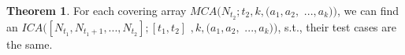 \documentclass[conference]{IEEEtran}
\theoremstyle{definition}
\newtheorem*{theorem}{Theorem}
\begin{document}
%
%
%
%


\begin{theorem}
For each covering array $MCA(N_{t_{2}}; t_{2}, k, (a_{1},a_{2},$ $...,a_{k}))$, we can find an $ICA([N_{t_{1}},N_{t_{1} + 1},...,N_{t_{2}}];[t_{1},t_{2}]$ $, k, (a_{1},a_{2},$ $...,a_{k}))$, s.t., their test cases are the same.
\end{theorem}
\end{document}
